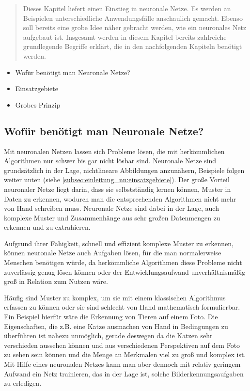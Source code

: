 \begin{tcolorbox}[title={Inhalt}]
  \begin{quotation}\noindent
      Dieses Kapitel liefert einen Einstieg in neuronale Netze. Es werden an Beispielen unterschiedliche Anwendungsfälle anschaulich gemacht.
      Ebenso soll bereits eine grobe Idee näher gebracht werden, wie ein neuronales Netz aufgebaut ist.
      Insgesamt werden in diesem Kapitel bereits zahlreiche grundlegende Begriffe erklärt, die in den nachfolgenden Kapiteln benötigt werden.
  \end{quotation}
  \begin{itemize}  
    \item Wofür benötigt man Neuronale Netze?
    \item Einsatzgebiete
    \item Grobes Prinzip
  \end{itemize}
\end{tcolorbox}

\subsection{Wofür benötigt man Neuronale Netze?}\label{subsec:einleitung_nn:wofuer_nn}
Mit neuronalen Netzen lassen sich Probleme lösen, die mit herkömmlichen Algorithmen nur schwer bis gar nicht lösbar sind. Neuronale Netze sind grundsätzlich in der Lage, nichtlineare Abbildungen anzunähern, Beispiele folgen weiter unten (siehe \ref*{subsec:einleitung_nn:einsatzgebiete}).
Der große Vorteil neuronaler Netze liegt darin, dass sie selbstständig lernen können, Muster in Daten zu erkennen, wodurch man die entsprechenden Algorithmen nicht mehr von Hand schreiben muss.
Neuronale Netze sind dabei in der Lage, auch komplexe Muster und Zusammenhänge aus sehr großen Datenmengen zu erkennen und zu extrahieren.

\bigbreak\noindent
Aufgrund ihrer Fähigkeit, schnell und effizient komplexe Muster zu erkennen, können neuronale Netze auch Aufgaben lösen, für die man normalerweise Menschen benötigen würde, da herkömmliche Algorithmen diese Probleme nicht zuverlässig genug lösen können oder der Entwicklungsaufwand unverhältnismäßig groß in Relation zum Nutzen wäre.

\bigbreak\noindent
Häufig sind Muster zu komplex, um sie mit einem klassischen Algorithmus erfassen zu können oder sie sind schlecht von Hand mathematisch formulierbar.
Ein Beispiel hierfür wäre die Erkennung von Tieren auf einem Foto. Die Eigenschaften, die z.B. eine Katze ausmachen von Hand in Bedingungen zu überführen ist nahezu unmöglich, gerade deswegen da die Katzen sehr verschieden aussehen können und aus verschiedenen Perspektiven auf dem Foto zu sehen sein können und die Menge an Merkmalen viel zu groß und komplex ist.
Mit Hilfe eines neuronalen Netzes kann man aber dennoch mit relativ geringem Aufwand ein Netz trainieren, das in der Lage ist, solche Bilderkennungsaufgaben zu erledigen.


